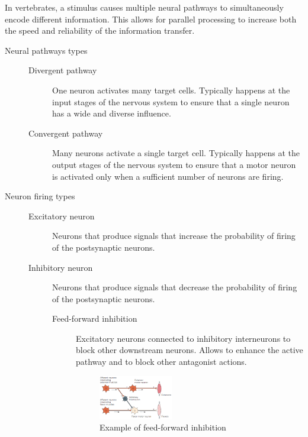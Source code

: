 \begin{remark}
    In vertebrates, a stimulus causes multiple neural pathways to simultaneously encode different information.
    This allows for parallel processing to increase both the speed and reliability of the information transfer.
\end{remark}

\begin{description}
    \item[Neural pathways types] \phantom{}
        \begin{description}
            \item[Divergent pathway] 
                One neuron activates many target cells.
                Typically happens at the input stages of the nervous system
                to ensure that a single neuron has a wide and diverse influence.

            \item[Convergent pathway] 
                Many neurons activate a single target cell.
                Typically happens at the output stages of the nervous system 
                to ensure that a motor neuron is activated only when a sufficient number of neurons are firing.
        \end{description}

    \item[Neuron firing types] \phantom{}
        \begin{description}
            \item[Excitatory neuron] 
                Neurons that produce signals that increase the probability of firing of the postsynaptic neurons.
                
            \item[Inhibitory neuron] 
                Neurons that produce signals that decrease the probability of firing of the postsynaptic neurons.
                
                \begin{description}
                    \item[Feed-forward inhibition] 
                        Excitatory neurons connected to inhibitory interneurons to block other downstream neurons.
                        Allows to enhance the active pathway and to block other antagonist actions.
                        \begin{figure}[H]
                            \centering
                            \includegraphics[width=0.4\textwidth]{./img/feedforward_inhibition.png}
                            \caption{Example of feed-forward inhibition}
                        \end{figure}


\end{description}
\end{description}
\end{description}
